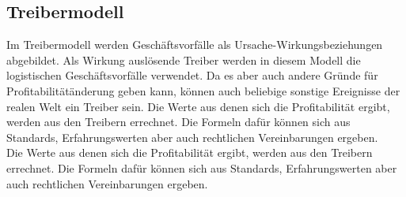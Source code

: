 \subsection{Treibermodell}
Im Treibermodell werden Geschäftsvorfälle als Ursache-Wirkungsbeziehungen abgebildet. Als Wirkung auslösende Treiber werden in diesem Modell die logistischen Geschäftsvorfälle verwendet. Da es aber auch andere Gründe für Profitabilitätänderung geben kann, können auch beliebige sonstige Ereignisse der realen Welt ein Treiber sein.
Die Werte aus denen sich die Profitabilität ergibt, werden aus den Treibern errechnet. Die Formeln dafür können sich aus Standards, Erfahrungswerten aber auch rechtlichen Vereinbarungen ergeben.
\\
Die Werte aus denen sich die Profitabilität ergibt, werden aus den Treibern errechnet. Die Formeln dafür können sich aus Standards, Erfahrungswerten aber auch rechtlichen Vereinbarungen ergeben. 


